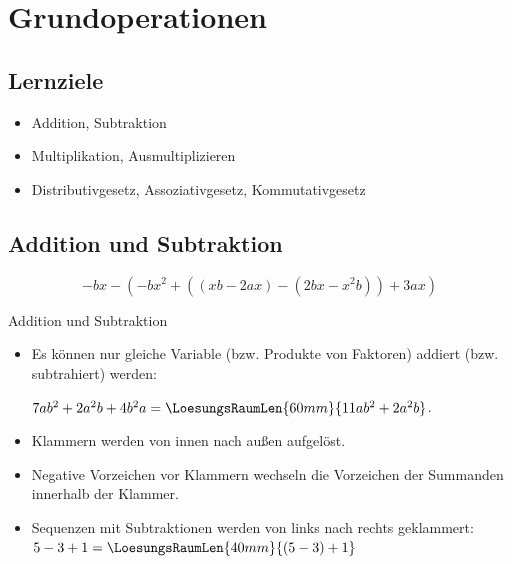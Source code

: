 \newpage
\section{Grundoperationen}
\renewcommand{\bbwAufgabenBlockID}{A1G}

\subsection*{Lernziele}
\begin{itemize}
\item Addition, Subtraktion
\item Multiplikation, Ausmultiplizieren
\item Distributivgesetz,
  Assoziativgesetz,
  Kommutativgesetz
\end{itemize}

\newpage

\subsection{Addition und Subtraktion}
\begin{beispiel}{}{}
$$-bx-(-bx^2+((xb-2ax)-(2bx-x^2b))+3ax)$$
\end{beispiel}


\begin{rezept}{Addition und Subtraktion}{}
\begin{itemize}
\item Es können nur gleiche Variable (bzw. Produkte von Faktoren)
      addiert (bzw. subtrahiert) werden:

      $7ab^2 +2a^2b+4b^2a = \LoesungsRaumLen{60mm}{11ab^2 + 2a^2b}$.
\item Klammern werden von innen nach außen aufgelöst.
\item Negative Vorzeichen vor Klammern wechseln die Vorzeichen der
      Summanden innerhalb der Klammer.
\item Sequenzen mit Subtraktionen werden von links
      nach rechts geklammert: $5-3+1 = \LoesungsRaumLen{40mm}{(5-3) + 1}$
\end{itemize}
\end{rezept}
 \newpage


